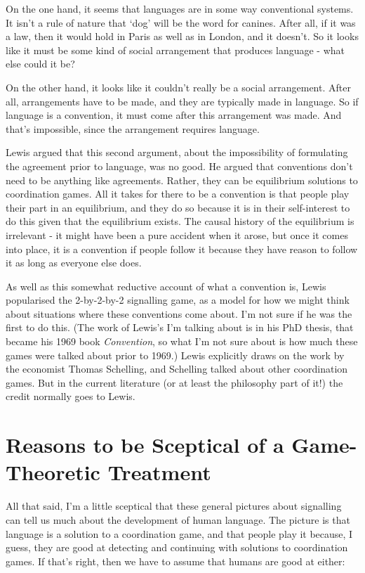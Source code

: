 \documentclass[11pt,]{article}
\begin{document}
On the one hand, it seems that languages are in some way conventional
systems. It isn't a rule of nature that `dog' will be the word for
canines. After all, if it was a law, then it would hold in Paris as well
as in London, and it doesn't. So it looks like it must be some kind of
social arrangement that produces language - what else could it be?

On the other hand, it looks like it couldn't really be a social
arrangement. After all, arrangements have to be made, and they are
typically made in language. So if language is a convention, it must come
after this arrangement was made. And that's impossible, since the
arrangement requires language.

Lewis argued that this second argument, about the impossibility of
formulating the agreement prior to language, was no good. He argued that
conventions don't need to be anything like agreements. Rather, they can
be equilibrium solutions to coordination games. All it takes for there
to be a convention is that people play their part in an equilibrium, and
they do so because it is in their self-interest to do this given that
the equilibrium exists. The causal history of the equilibrium is
irrelevant - it might have been a pure accident when it arose, but once
it comes into place, it is a convention if people follow it because they
have reason to follow it as long as everyone else does.

As well as this somewhat reductive account of what a convention is,
Lewis popularised the 2-by-2-by-2 signalling game, as a model for how we
might think about situations where these conventions come about. I'm not
sure if he was the first to do this. (The work of Lewis's I'm talking
about is in his PhD thesis, that became his 1969 book \emph{Convention},
so what I'm not sure about is how much these games were talked about
prior to 1969.) Lewis explicitly draws on the work by the economist
Thomas Schelling, and Schelling talked about other coordination games.
But in the current literature (or at least the philosophy part of it!)
the credit normally goes to Lewis.

\hypertarget{reasons-to-be-sceptical-of-a-game-theoretic-treatment}{%
\section{Reasons to be Sceptical of a Game-Theoretic
Treatment}\label{reasons-to-be-sceptical-of-a-game-theoretic-treatment}}

All that said, I'm a little sceptical that these general pictures about
signalling can tell us much about the development of human language. The
picture is that language is a solution to a coordination game, and that
people play it because, I guess, they are good at detecting and
continuing with solutions to coordination games. If that's right, then
we have to assume that humans are good at either:
\end{document}
